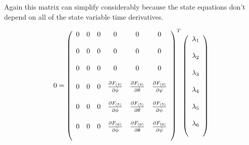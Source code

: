 Again this matrix can simplify considerably because the state equations don't depend on all of the state variable time derivatives.

\begin{equation}
    0 = \left(
    \begin{array}{c c c c c c}
    0&0&0&0&0&0\\\\
    0&0&0&0&0&0\\\\
    0&0&0&0&0&0\\\\

    0&0&0 & \frac{\partial F_{(4)}}{\partial \dot \phi} & \frac{\partial F_{(4)}}{\partial \dot \theta} & \frac{\partial F_{(4)}}{\partial \dot \psi}\\\\

    0&0&0 & \frac{\partial F_{(5)}}{\partial \dot \phi} & \frac{\partial F_{(5)}}{\partial \dot \theta} & \frac{\partial F_{(5)}}{\partial \dot \psi}\\\\

    0&0&0 & \frac{\partial F_{(6)}}{\partial \dot \phi} & \frac{\partial F_{(6)}}{\partial \dot \theta} & \frac{\partial F_{(6)}}{\partial \dot \psi}\\\\

    \end{array}\right)^T\left(
    \begin{array}{c}
    \lambda_1\\\\
    \lambda_2\\\\
    \lambda_3\\\\
    \lambda_4\\\\
    \lambda_5\\\\
    \lambda_6\\\\
    \end{array}\right)
\end{equation}

